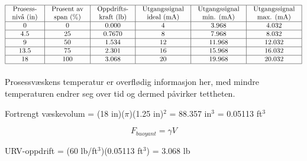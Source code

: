 

$$\vbox{\offinterlineskip
\halign{\strut
\vrule \quad\hfil # \ \hfil &
\vrule \quad\hfil # \ \hfil &
\vrule \quad\hfil # \ \hfil &
\vrule \quad\hfil # \ \hfil &
\vrule \quad\hfil # \ \hfil &
\vrule \quad\hfil # \ \hfil \vrule \cr
\noalign{\hrule}
%
Prosess- & Prosent av & Oppdrifts- & Utgangssignal & Utgangssignal & Utgangssignal \cr
%
nivå (in) & span (\%) & kraft (lb) & ideal (mA) & min. (mA) & max. (mA) \cr
%
\noalign{\hrule}
%
0 & 0 & 0.000 & 4 & 3.968 & 4.032 \cr
%
\noalign{\hrule}
%
4.5 & 25 & 0.7670 & 8 & 7.968 & 8.032 \cr
%
\noalign{\hrule}
%
9 & 50 & 1.534 & 12 & 11.968 & 12.032 \cr
%
\noalign{\hrule}
%
13.5 & 75 & 2.301 & 16 & 15.968 & 16.032 \cr
%
\noalign{\hrule}
%
18 & 100 & 3.068 & 20 & 19.968 & 20.032 \cr
%
\noalign{\hrule}
} %
}$$ %







Prosessvæskens temperatur er overflødig informasjon her, med mindre temperaturen endrer seg over tid og dermed påvirker tettheten.

\vskip 10pt

Fortrengt væskevolum = (18 in)($\pi$)(1.25 in)$^{2}$ = 88.357 in$^{3}$ = 0.05113 ft$^{3}$

$$F_{buoyant} = \gamma V$$

URV-oppdrift = (60 lb/ft$^{3}$)(0.05113 ft$^{3}$) = 3.068 lb


